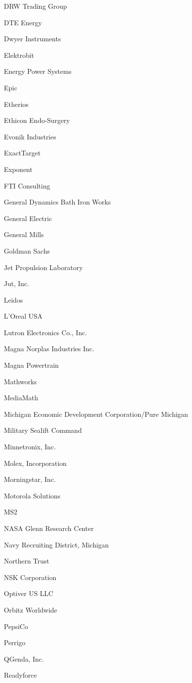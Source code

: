 \documentclass[twoside]{article}
\begin{document}
\begin{center}
\begin{multicols}{5}
\begin{FlushLeft}
\begin{compactitem}
\item DRW Trading Group
\item DTE Energy
\item Dwyer Instruments
\item Elektrobit
\item Energy Power Systems
\item Epic
\item Etherios
\item Ethicon Endo-Surgery
\item Evonik Industries
\item ExactTarget
\item Exponent
\item FTI Consulting
\item General Dynamics Bath Iron Works
\item General Electric
\item General Mills
\item Goldman Sachs
\item Jet Propulsion Laboratory
\item Jut, Inc.
\item Leidos
\item L'Oreal USA
\item Lutron Electronics Co., Inc.
\item Magna Norplas Industries Inc.
\item Magna Powertrain
\item Mathworks
\item MediaMath
\item Michigan Economic Development Corporation/Pure Michigan
\item Military Sealift Command
\item Minnetronix, Inc.
\item Molex, Incorporation
\item Morningstar, Inc.
\item Motorola Solutions
\item MS2
\item NASA Glenn Research Center
\item Navy Recruiting District, Michigan
\item Northern Trust
\item NSK Corporation
\item Optiver US LLC
\item Orbitz Worldwide
\item PepsiCo
\item Perrigo
\item QGenda, Inc.
\item Readyforce

\end{compactitem}
\end{FlushLeft}
\end{multicols}
\end{center}
\end{document}
